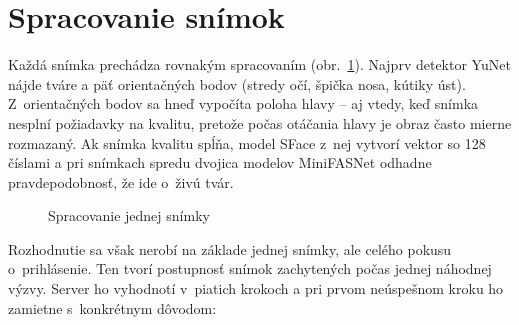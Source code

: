 \documentclass[12pt,a4paper,oneside]{report}
\begin{document}
\section{Spracovanie snímok}

Každá snímka prechádza rovnakým spracovaním (obr.~\ref{fig:retazec}). Najprv detektor
YuNet \cite{wu2023yunet} nájde tváre a päť orientačných bodov (stredy očí, špička nosa,
kútiky úst). Z~orientačných bodov sa hneď vypočíta poloha hlavy -- aj vtedy, keď snímka
nesplní požiadavky na kvalitu, pretože počas otáčania hlavy je obraz často mierne
rozmazaný. Ak snímka kvalitu spĺňa, model SFace \cite{zhong2021sface} z~nej vytvorí
vektor so 128 číslami a pri snímkach spredu dvojica modelov MiniFASNet odhadne
pravdepodobnosť, že ide o~živú tvár.

\begin{figure}[H]
  \centering
  \caption{Spracovanie jednej snímky}
  \label{fig:retazec}
\end{figure}

Rozhodnutie sa však nerobí na základe jednej snímky, ale celého pokusu o~prihlásenie.
Ten tvorí postupnosť snímok zachytených počas jednej náhodnej výzvy. Server ho vyhodnotí
v~piatich krokoch a pri prvom neúspešnom kroku ho zamietne s~konkrétnym dôvodom:
\end{document}
